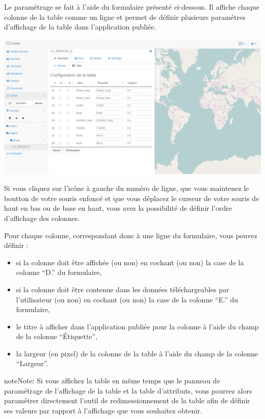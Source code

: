 \documentclass[letterpaper,10pt,french]{sphinxmanual}
\begin{document}
Le paramétrage se fait à l'aide du formulaire présenté ci-dessous. Il
affiche chaque colonne de la table comme un ligne et permet de définir
plusieurs paramétres d'affichage de la table dans l'application
publiée.

\includegraphics[width=1.000\linewidth]{set-layer-table.png}

Si vous cliquez sur l'icône à gauche du numéro de ligne, que vous
maintenez le boutton de votre souris enfoncé et que vous déplacez
le curseur de votre souris de haut en bas ou de base en haut, vous
avez la possibilité de définir l'ordre d'affichage des colonnes.

Pour chaque colonne, correspondant donc à une ligne du formulaire, vous
pouvez définir :
\begin{itemize}
\item {} 
si la colonne doit être affichée (ou non) en cochant (ou non) la case de la colonne ``D.'' du formulaire,

\item {} 
si la colonne doit être contenue dans les données téléchargeables par l'utilisateur (ou non) en cochant (ou non) la case de la colonne ``E.'' du formulaire,

\item {} 
le titre à afficher dans l'application publiée pour la colonne à l'aide du champ de la colonne ``Étiquette'',

\item {} 
la largeur (en pixel) de la colonne de la table à l'aide du champ de la colonne ``Largeur''.

\end{itemize}

\begin{notice}{note}{Note:}
Si vous affichez la table en même temps que le panneau de
paramétrage de l'affichage de la table et la table d'attributs,
vous pourrez alors paramétrer directement l'outil de redimessionnement de la
table afin de définir ses valeurs par rapport à l'affichage que
vous souhaitez obtenir.
\end{notice}
\end{document}
